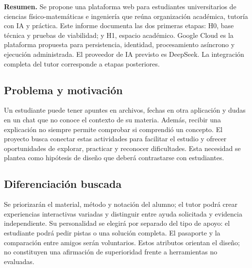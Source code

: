 \textbf{Resumen.} Se propone una plataforma web para estudiantes universitarios de ciencias físico-matemáticas e ingeniería que reúna organización académica, tutoría con IA y práctica. Este informe documenta las dos primeras etapas: H0, base técnica y pruebas de viabilidad; y H1, espacio académico. Google Cloud es la plataforma propuesta para persistencia, identidad, procesamiento asíncrono y ejecución administrada. El proveedor de IA previsto es DeepSeek. La integración completa del tutor corresponde a etapas posteriores.

\subsection*{Problema y motivación}
Un estudiante puede tener apuntes en archivos, fechas en otra aplicación y dudas en un chat que no conoce el contexto de su materia. Además, recibir una explicación no siempre permite comprobar si comprendió un concepto. El proyecto busca conectar estas actividades para facilitar el estudio y ofrecer oportunidades de explorar, practicar y reconocer dificultades. Esta necesidad se plantea como hipótesis de diseño que deberá contrastarse con estudiantes.


\subsection*{Diferenciación buscada}
Se priorizarán el material, método y notación del alumno; el tutor podrá crear experiencias interactivas variadas y distinguir entre ayuda solicitada y evidencia independiente. Su personalidad se elegirá por separado del tipo de apoyo: el estudiante podrá pedir pistas o una solución completa. El pasaporte y la comparación entre amigos serán voluntarios. Estos atributos orientan el diseño; no constituyen una afirmación de superioridad frente a herramientas no evaluadas.

